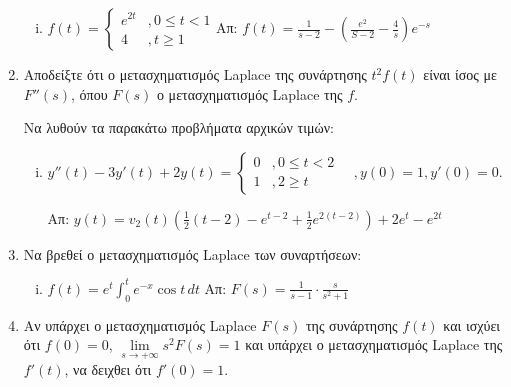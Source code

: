 \begin{enumerate}
\begin{enumerate}[i)]
\item $f(t)=\begin{cases}
e^{2t} & ,0\leq t<1 \\
4 & , t\geq 1
\end{cases}$\hfill Απ: $f(t)=\frac{1}{s-2}-(\frac{e^2}{S-2}-\frac{4}{s})e^{-s}$


\end{enumerate}

\item Αποδείξτε ότι ο μετασχηματισμός Laplace της συνάρτησης $t^2f(t)$ είναι ίσος με $F''(s)$, όπου $F(s)$ ο μετασχηματισμός Laplace της $f$.

Να λυθούν τα παρακάτω προβλήματα αρχικών τιμών:

\begin{enumerate}[i)]

\item $y''(t)-3y'(t)+2y(t)=\begin{cases}
0 & , 0\leq t <2 \\
1 & , 2\geq t
\end{cases}
\quad , y(0)=1, y'(0)=0$.

\hfill Απ: $y(t)=v_2(t)(\frac{1}{2}(t-2)-e^{t-2}+\frac{1}{2}e^{2(t-2)})+2e^t-e^{2t}$

\end{enumerate}

\item Να βρεθεί ο μετασχηματισμός Laplace των συναρτήσεων: 

\begin{enumerate}[i)]

\item $f(t)=e^t\int_{0}^{t}e^{-x}\cos t\,dt$ \hfill Απ: $F(s)=\frac{1}{s-1}\cdot \frac{s}{s^2+1}$

\end{enumerate}

\item Αν υπάρχει ο μετασχηματισμός Laplace $F(s)$ της συνάρτησης $f(t)$ και ισχύει ότι $f(0)=0$, $\lim\limits_{s\to+\infty}s^2F(s)=1$ και υπάρχει ο μετασχηματισμός Laplace της $f'(t)$, να δειχθει ότι $f'(0)=1$.

\end{enumerate}






